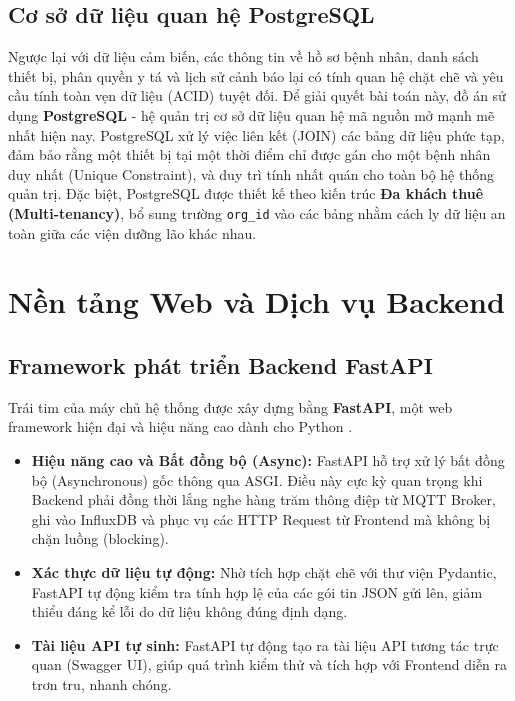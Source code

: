 \documentclass[../DoAn.tex]{subfiles}
\begin{document}
\subsection{Cơ sở dữ liệu quan hệ PostgreSQL}
Ngược lại với dữ liệu cảm biến, các thông tin về hồ sơ bệnh nhân, danh sách thiết bị, phân quyền y tá và lịch sử cảnh báo lại có tính quan hệ chặt chẽ và yêu cầu tính toàn vẹn dữ liệu (ACID) tuyệt đối. Để giải quyết bài toán này, đồ án sử dụng \textbf{PostgreSQL} - hệ quản trị cơ sở dữ liệu quan hệ mã nguồn mở mạnh mẽ nhất hiện nay. PostgreSQL xử lý việc liên kết (JOIN) các bảng dữ liệu phức tạp, đảm bảo rằng một thiết bị tại một thời điểm chỉ được gán cho một bệnh nhân duy nhất (Unique Constraint), và duy trì tính nhất quán cho toàn bộ hệ thống quản trị. Đặc biệt, PostgreSQL được thiết kế theo kiến trúc \textbf{Đa khách thuê (Multi-tenancy)}, bổ sung trường \texttt{org\_id} vào các bảng nhằm cách ly dữ liệu an toàn giữa các viện dưỡng lão khác nhau.


\section{Nền tảng Web và Dịch vụ Backend}
\label{section:3.6}

\subsection{Framework phát triển Backend FastAPI}
Trái tim của máy chủ hệ thống được xây dựng bằng \textbf{FastAPI}, một web framework hiện đại và hiệu năng cao dành cho Python \cite{ramirez2023fastapi}.
\begin{itemize}
    \item \textbf{Hiệu năng cao và Bất đồng bộ (Async):} FastAPI hỗ trợ xử lý bất đồng bộ (Asynchronous) gốc thông qua ASGI. Điều này cực kỳ quan trọng khi Backend phải đồng thời lắng nghe hàng trăm thông điệp từ MQTT Broker, ghi vào InfluxDB và phục vụ các HTTP Request từ Frontend mà không bị chặn luồng (blocking).
    \item \textbf{Xác thực dữ liệu tự động:} Nhờ tích hợp chặt chẽ với thư viện Pydantic, FastAPI tự động kiểm tra tính hợp lệ của các gói tin JSON gửi lên, giảm thiểu đáng kể lỗi do dữ liệu không đúng định dạng.
    \item \textbf{Tài liệu API tự sinh:} FastAPI tự động tạo ra tài liệu API tương tác trực quan (Swagger UI), giúp quá trình kiểm thử và tích hợp với Frontend diễn ra trơn tru, nhanh chóng.
\end{itemize}
\end{document}
